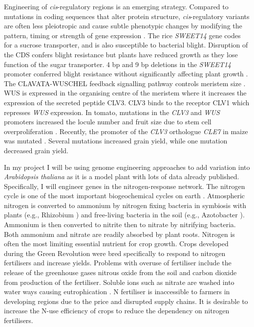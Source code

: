 \documentclass[../main.tex]{subfiles}
\begin{document}
Engineering of \textit{cis}\hyp{}regulatory regions is an emerging strategy.
Compared to mutations in coding sequences that alter protein structure, \textit{cis}\hyp{}regulatory variants are often less pleiotropic and cause subtle phenotypic changes by modifying the pattern, timing or strength of gene expression \autocite{wittkoppCisregulatoryElementsMolecular2012}.
The rice \textit{SWEET14} gene codes for a sucrose transporter, and is also susceptible to bacterial blight.
Disruption of the CDS confers blight resistance but plants have reduced growth as they lose function of the sugar transporter.
4 bp and 9 bp deletions in the \textit{SWEET14} promoter conferred blight resistance without significantly affecting plant growth \autocite{liHighefficiencyTALENbasedGene2012}.
The CLAVATA-WUSCHEL feedback signalling pathway controls meristem size \autocite{somssichCLAVATAWUSCHELSignalingShoot2016}.
WUS is expressed in the organising centre of the meristem where it increases the expression of the secreted peptide CLV3.
CLV3 binds to the receptor CLV1 which represses \textit{WUS} expression.
In tomato, mutations in the \textit{CLV3} and \textit{WUS} promoters increased the locule number and fruit size due to stem cell overproliferation \autocite{rodriguez-lealEngineeringQuantitativeTrait2017}.
Recently, the promoter of the \textit{CLV3} orthologue \textit{CLE7} in maize was mutated \autocite{liuEnhancingGrainyieldrelatedTraits2021}.
Several mutations increased grain yield, while one mutation decreased grain yield.

In my project I will be using genome engineering approaches to add variation into \textit{Arabidopsis thaliana} as it is a model plant with lots of data already published.
Specifically, I will engineer genes in the nitrogen\hyp{}response network.
The nitrogen cycle is one of the most important biogeochemical cycles on earth \autocite{lehnertReversingNitrogenFixation2018}.
Atmospheric nitrogen is converted to ammonium by nitrogen fixing bacteria in symbiosis with plants (e.g., Rhizobium \autocite{molingEvolutionRhizobiumNodulation2015}) and free\hyp{}living bacteria in the soil (e.g., Azotobacter \autocite{bhattacharyyaPlantGrowthpromotingRhizobacteria2012}).
Ammonium is then converted to nitrite then to nitrate by nitrifying bacteria.
Both ammonium and nitrate are readily absorbed by plant roots.
Nitrogen is often the most limiting essential nutrient for crop growth.
Crops developed during the Green Revolution were bred specifically to respond to nitrogen fertilisers and increase yields.
Problems with overuse of fertiliser include the release of the greenhouse gases nitrous oxide from the soil \autocite{zumftCellBiologyMolecular1997} and carbon dioxide from production of the fertiliser.
Soluble ions such as nitrate are washed into water ways causing eutrophication \autocite{gallowayChronologyHumanUnderstanding2013}.
N fertiliser is inaccessible to farmers in developing regions due to the price and disrupted supply chains.
It is desirable to increase the N\hyp{}use efficiency of crops to reduce the dependency on nitrogen fertilisers.
\end{document}
